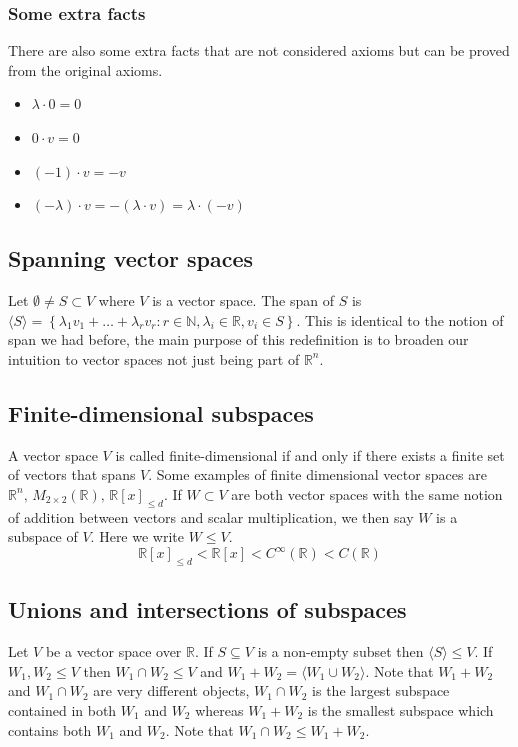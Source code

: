 \documentclass[12pt]{article}
\begin{document}
\subsubsection*{Some extra facts}
There are also some extra facts that are not considered axioms but can be proved from the original axioms.
\begin{itemize}
    \item \(\lambda\cdot0=0\)
    \item \(0\cdot v=0\)
    \item \((-1)\cdot v=-v\)
    \item \((-\lambda)\cdot v=-(\lambda\cdot v)=\lambda\cdot(-v)\)
\end{itemize}
\subsection*{Spanning vector spaces}
Let \(\emptyset \ne S\subset V\) where \(V\) is a vector space. The span of \(S\) is \(\langle S\rangle=\left\{\lambda_1v_1+\dots+\lambda_rv_r:r\in\mathbb{N},\lambda_i\in\mathbb{R},v_i\in S\right\}\). This is identical to the notion of span we had before, the main purpose of this redefinition is to broaden our intuition to vector spaces not just being part of \(\mathbb{R}^n\).
\subsection*{Finite-dimensional subspaces}
A vector space \(V\) is called finite-dimensional if and only if there exists a finite set of vectors that spans \(V\). Some examples of finite dimensional vector spaces are \(\mathbb{R}^n,\,M_{2\times2}(\mathbb{R}),\,\mathbb{R}[x]_{\leq d}\). If \(W\subset V\) are both vector spaces with the same notion of addition between vectors and scalar multiplication, we then say \(W\) is a subspace of \(V\). Here we write \(W\leqslant V\).
\[\mathbb{R}[x]_{\leq d}<\mathbb{R}[x]<C^\infty(\mathbb{R})<C(\mathbb{R})\]
\subsection*{Unions and intersections of subspaces}
Let \(V\) be a vector space over \(\mathbb{R}\). If \(S\subseteq V\) is a non-empty subset then \(\langle S\rangle \leqslant V\). If \(W_1,W_2\leqslant V\) then \(W_1\cap W_2\leqslant V\) and \(W_1+W_2=\langle W_1\cup W_2\rangle\). Note that \(W_1+W_2\) and \(W_1\cap W_2\) are very different objects, \(W_1\cap W_2\) is the largest subspace contained in both \(W_1\) and \(W_2\) whereas \(W_1 + W_2\) is the smallest subspace which contains both \(W_1\) and \(W_2\). Note that \(W_1\cap W_2\leqslant W_1+W_2\).
\end{document}
